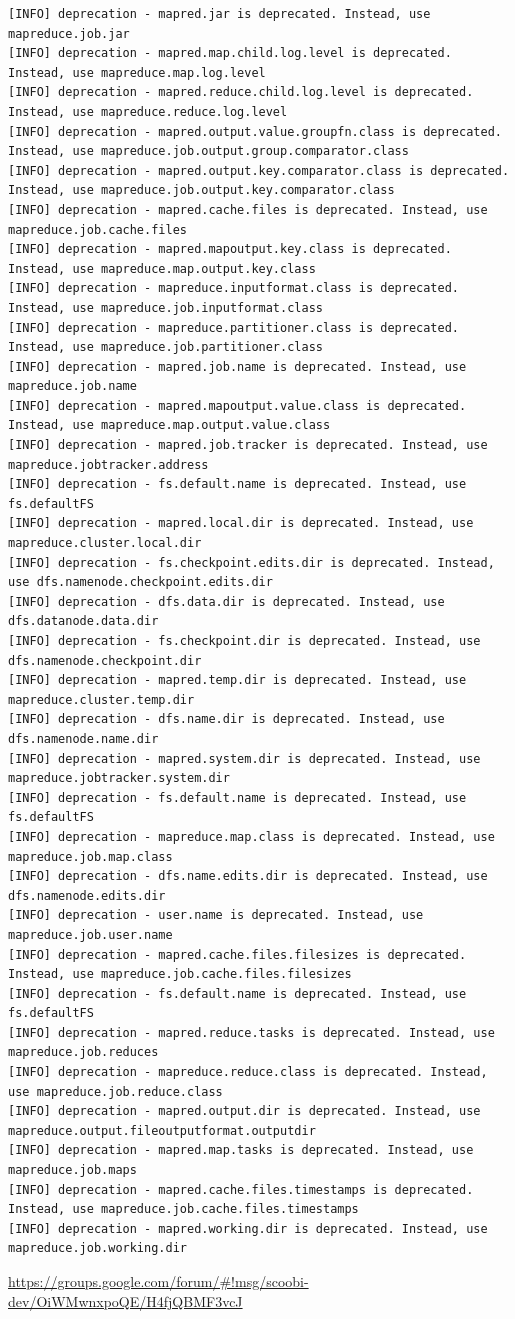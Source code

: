 {\small
\begin{verbatim}
[INFO] deprecation - mapred.jar is deprecated. Instead, use mapreduce.job.jar
[INFO] deprecation - mapred.map.child.log.level is deprecated. Instead, use mapreduce.map.log.level
[INFO] deprecation - mapred.reduce.child.log.level is deprecated. Instead, use mapreduce.reduce.log.level
[INFO] deprecation - mapred.output.value.groupfn.class is deprecated. Instead, use mapreduce.job.output.group.comparator.class
[INFO] deprecation - mapred.output.key.comparator.class is deprecated. Instead, use mapreduce.job.output.key.comparator.class
[INFO] deprecation - mapred.cache.files is deprecated. Instead, use mapreduce.job.cache.files
[INFO] deprecation - mapred.mapoutput.key.class is deprecated. Instead, use mapreduce.map.output.key.class
[INFO] deprecation - mapreduce.inputformat.class is deprecated. Instead, use mapreduce.job.inputformat.class
[INFO] deprecation - mapreduce.partitioner.class is deprecated. Instead, use mapreduce.job.partitioner.class
[INFO] deprecation - mapred.job.name is deprecated. Instead, use mapreduce.job.name
[INFO] deprecation - mapred.mapoutput.value.class is deprecated. Instead, use mapreduce.map.output.value.class
[INFO] deprecation - mapred.job.tracker is deprecated. Instead, use mapreduce.jobtracker.address
[INFO] deprecation - fs.default.name is deprecated. Instead, use fs.defaultFS
[INFO] deprecation - mapred.local.dir is deprecated. Instead, use mapreduce.cluster.local.dir
[INFO] deprecation - fs.checkpoint.edits.dir is deprecated. Instead, use dfs.namenode.checkpoint.edits.dir
[INFO] deprecation - dfs.data.dir is deprecated. Instead, use dfs.datanode.data.dir
[INFO] deprecation - fs.checkpoint.dir is deprecated. Instead, use dfs.namenode.checkpoint.dir
[INFO] deprecation - mapred.temp.dir is deprecated. Instead, use mapreduce.cluster.temp.dir
[INFO] deprecation - dfs.name.dir is deprecated. Instead, use dfs.namenode.name.dir
[INFO] deprecation - mapred.system.dir is deprecated. Instead, use mapreduce.jobtracker.system.dir
[INFO] deprecation - fs.default.name is deprecated. Instead, use fs.defaultFS
[INFO] deprecation - mapreduce.map.class is deprecated. Instead, use mapreduce.job.map.class
[INFO] deprecation - dfs.name.edits.dir is deprecated. Instead, use dfs.namenode.edits.dir
[INFO] deprecation - user.name is deprecated. Instead, use mapreduce.job.user.name
[INFO] deprecation - mapred.cache.files.filesizes is deprecated. Instead, use mapreduce.job.cache.files.filesizes
[INFO] deprecation - fs.default.name is deprecated. Instead, use fs.defaultFS
[INFO] deprecation - mapred.reduce.tasks is deprecated. Instead, use mapreduce.job.reduces
[INFO] deprecation - mapreduce.reduce.class is deprecated. Instead, use mapreduce.job.reduce.class
[INFO] deprecation - mapred.output.dir is deprecated. Instead, use mapreduce.output.fileoutputformat.outputdir
[INFO] deprecation - mapred.map.tasks is deprecated. Instead, use mapreduce.job.maps
[INFO] deprecation - mapred.cache.files.timestamps is deprecated. Instead, use mapreduce.job.cache.files.timestamps
[INFO] deprecation - mapred.working.dir is deprecated. Instead, use mapreduce.job.working.dir
\end{verbatim}
}
\url{https://groups.google.com/forum/#!msg/scoobi-dev/OiWMwnxpoQE/H4fjQBMF3vcJ}

